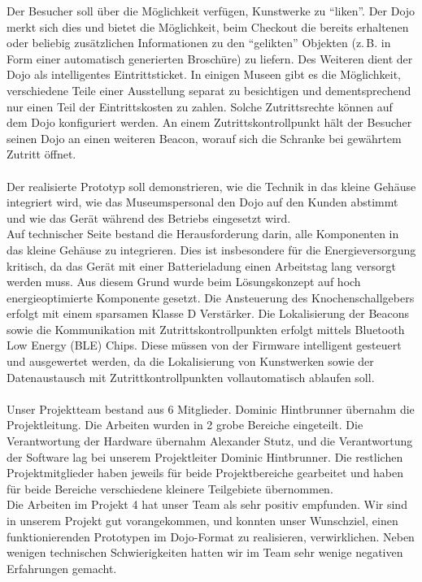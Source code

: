 Der Besucher soll über die Möglichkeit verfügen, Kunstwerke zu ``liken''. Der Dojo merkt sich dies und bietet die Möglichkeit, beim Checkout die bereits erhaltenen oder beliebig zusätzlichen Informationen zu den ``gelikten'' Objekten (z.\,B. in Form einer automatisch generierten Broschüre) zu liefern.
Des Weiteren dient der Dojo als intelligentes Eintrittsticket. In einigen Museen gibt es die Möglichkeit, verschiedene Teile einer Ausstellung separat zu besichtigen und dementsprechend nur einen Teil der Eintrittskosten zu zahlen. Solche Zutrittsrechte können auf dem Dojo konfiguriert werden. An einem Zutrittskontrollpunkt hält der Besucher seinen Dojo an einen weiteren Beacon, worauf sich die Schranke bei gewährtem Zutritt öffnet.\\\\
Der realisierte Prototyp soll demonstrieren, wie die Technik in das kleine Gehäuse integriert wird, wie das Museumspersonal den Dojo auf den Kunden abstimmt und wie das Gerät während des Betriebs eingesetzt wird.\\
Auf technischer Seite bestand die Herausforderung darin, alle Komponenten in das kleine Gehäuse zu integrieren. Dies ist insbesondere für die Energieversorgung kritisch, da das Gerät mit einer Batterieladung einen Arbeitstag lang versorgt werden muss. Aus diesem Grund wurde beim Lösungskonzept auf hoch energieoptimierte Komponente gesetzt. Die Ansteuerung des Knochenschallgebers erfolgt mit einem sparsamen Klasse D Verstärker. Die Lokalisierung der Beacons sowie die Kommunikation mit Zutrittskontrollpunkten erfolgt mittels Bluetooth Low Energy (BLE) Chips. Diese müssen von der Firmware intelligent gesteuert und ausgewertet werden, da die Lokalisierung von Kunstwerken sowie der Datenaustausch mit Zutrittkontrollpunkten vollautomatisch ablaufen soll.\\\\
Unser Projektteam bestand aus 6 Mitglieder. Dominic Hintbrunner übernahm die Projektleitung. Die Arbeiten wurden in 2 grobe Bereiche eingeteilt. Die Verantwortung der Hardware übernahm Alexander Stutz, und die Verantwortung der Software lag bei unserem Projektleiter Dominic Hintbrunner. Die restlichen Projektmitglieder haben jeweils für beide Projektbereiche gearbeitet und haben für beide Bereiche verschiedene kleinere Teilgebiete übernommen.\\
Die Arbeiten im Projekt 4 hat unser Team als sehr positiv empfunden. Wir sind in unserem Projekt gut vorangekommen, und konnten unser Wunschziel, einen funktionierenden Prototypen im Dojo-Format zu realisieren, verwirklichen. Neben wenigen technischen Schwierigkeiten hatten wir im Team sehr wenige negativen Erfahrungen gemacht.